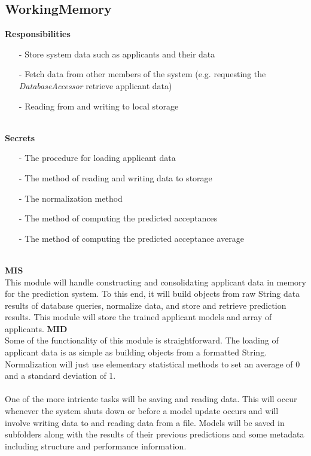 \documentclass[titlepage]{article}
\begin{document}
\subsection{WorkingMemory}
\textbf{Responsibilities}
\begin{itemize}
	\item[-] Store system data such as applicants and their data
	\item[-] Fetch data from other members of the system (e.g. requesting the \textit{DatabaseAccessor} retrieve applicant data)
	\item[-] Reading from and writing to local storage
\end{itemize}~\\
\textbf{Secrets}
\begin{itemize}
	\item[-] The procedure for loading applicant data
	\item[-] The method of reading and writing data to storage
	\item[-] The normalization method
	\item[-] The method of computing the predicted acceptances
	\item[-] The method of computing the predicted acceptance average
\end{itemize}~\\
\textbf{MIS}\\[2mm]
This module will handle constructing and consolidating applicant data in memory for the prediction system. To this end, it will build objects from raw String data results of database queries, normalize data, and store and retrieve prediction results. This module will store the trained applicant models and array of applicants.\newpage
\noindent\textbf{MID}\\[2mm]
Some of the functionality of this module is straightforward. The loading of applicant data is as simple as building objects from a formatted String. Normalization will just use elementary statistical methods to set an average of 0 and a standard deviation of 1.\\~\\
One of the more intricate tasks will be saving and reading data. This will occur whenever the system shuts down or before a model update occurs and will involve writing data to and reading data from a file. Models will be saved in subfolders along with the results of their previous predictions and some metadata including structure and performance information.\\~\\
\end{document}
